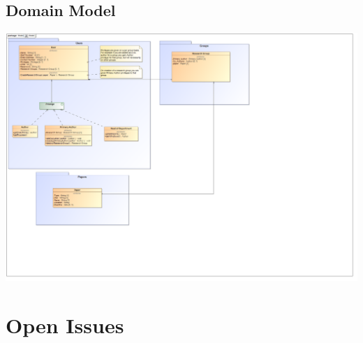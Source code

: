\documentclass[11pt]{article}
\begin{document}
\subsection{Domain Model}
\begin{center}
	\includegraphics[width=\textwidth]{../Images/DomainModel.png}\\[0.5cm]
\end{center}

\section{Open Issues}

\newpage
{}

{}
\end{document}
